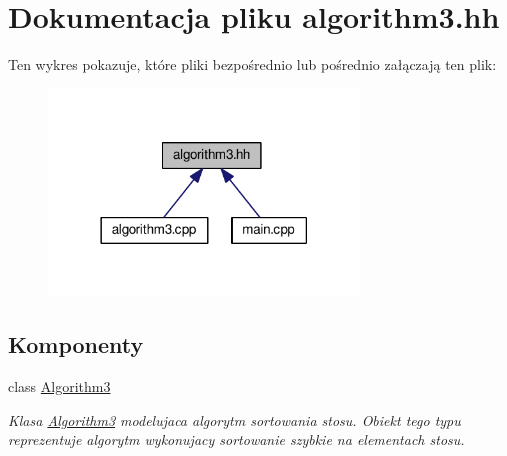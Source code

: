 \hypertarget{algorithm3_8hh}{\section{Dokumentacja pliku algorithm3.\-hh}
\label{algorithm3_8hh}
}
Ten wykres pokazuje, które pliki bezpośrednio lub pośrednio załączają ten plik\-:\nopagebreak
\begin{figure}[H]
\begin{center}
\leavevmode
\includegraphics[width=234pt]{algorithm3_8hh__dep__incl}
\end{center}
\end{figure}
\subsection*{Komponenty}
\begin{DoxyCompactItemize}
\item 
class \hyperlink{class_algorithm3}{Algorithm3}
\begin{DoxyCompactList}\small\item\em Klasa \hyperlink{class_algorithm3}{Algorithm3} modelujaca algorytm sortowania stosu. Obiekt tego typu reprezentuje algorytm wykonujacy sortowanie szybkie na elementach stosu. \end{DoxyCompactList}\end{DoxyCompactItemize}
